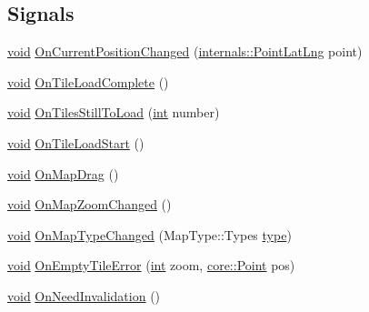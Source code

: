 \subsection*{Signals}
\begin{DoxyCompactItemize}
\item 
\hyperlink{group___u_a_v_objects_plugin_ga444cf2ff3f0ecbe028adce838d373f5c}{void} \hyperlink{group___o_p_map_widget_ga2491a90fa3143792bc6f14153750d5d2}{On\-Current\-Position\-Changed} (\hyperlink{structinternals_1_1_point_lat_lng}{internals\-::\-Point\-Lat\-Lng} point)
\item 
\hyperlink{group___u_a_v_objects_plugin_ga444cf2ff3f0ecbe028adce838d373f5c}{void} \hyperlink{group___o_p_map_widget_gac03cc68ae31948f87512df9b4b25a104}{On\-Tile\-Load\-Complete} ()
\item 
\hyperlink{group___u_a_v_objects_plugin_ga444cf2ff3f0ecbe028adce838d373f5c}{void} \hyperlink{group___o_p_map_widget_ga8fbc5fa54e3d35c3008d0117c998638e}{On\-Tiles\-Still\-To\-Load} (\hyperlink{ioapi_8h_a787fa3cf048117ba7123753c1e74fcd6}{int} number)
\item 
\hyperlink{group___u_a_v_objects_plugin_ga444cf2ff3f0ecbe028adce838d373f5c}{void} \hyperlink{group___o_p_map_widget_gae5debcd025be8ef286b44c846bcf307d}{On\-Tile\-Load\-Start} ()
\item 
\hyperlink{group___u_a_v_objects_plugin_ga444cf2ff3f0ecbe028adce838d373f5c}{void} \hyperlink{group___o_p_map_widget_ga86c23f03f213d9cdd416259faa5e1835}{On\-Map\-Drag} ()
\item 
\hyperlink{group___u_a_v_objects_plugin_ga444cf2ff3f0ecbe028adce838d373f5c}{void} \hyperlink{group___o_p_map_widget_ga79ea52272693c681261bee7f02cdd9a4}{On\-Map\-Zoom\-Changed} ()
\item 
\hyperlink{group___u_a_v_objects_plugin_ga444cf2ff3f0ecbe028adce838d373f5c}{void} \hyperlink{group___o_p_map_widget_ga9be685397ee72f5e1ecc2694b61d0819}{On\-Map\-Type\-Changed} (Map\-Type\-::\-Types \hyperlink{glext_8h_a7d05960f4f1c1b11f3177dc963a45d86}{type})
\item 
\hyperlink{group___u_a_v_objects_plugin_ga444cf2ff3f0ecbe028adce838d373f5c}{void} \hyperlink{group___o_p_map_widget_ga0b750ffa3c184237b9625bdb9fa8c2c8}{On\-Empty\-Tile\-Error} (\hyperlink{ioapi_8h_a787fa3cf048117ba7123753c1e74fcd6}{int} zoom, \hyperlink{structcore_1_1_point}{core\-::\-Point} pos)
\item 
\hyperlink{group___u_a_v_objects_plugin_ga444cf2ff3f0ecbe028adce838d373f5c}{void} \hyperlink{group___o_p_map_widget_gaa550210d61bf033b3dd3d73fbfd7d8f9}{On\-Need\-Invalidation} ()
\end{DoxyCompactItemize}
